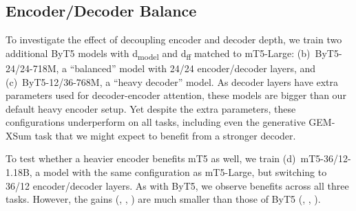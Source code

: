 \documentclass[11pt,a4paper]{article}
\begin{document}
\begin{table}[t!]
\centering
{}
\caption{Ablation model results across three tasks.}
\label{tab:ablation_results}
\end{table} 
\subsection{Encoder/Decoder Balance}

To investigate the effect of decoupling encoder and decoder depth, we train two additional ByT5 models with d\textsubscript{model} and d\textsubscript{ff} matched to \mbox{mT5-Large}: (b)~ByT5-24/24-718M, a ``balanced'' model with 24/24 encoder/decoder layers, and (c)~ByT5-12/36-768M, a ``heavy decoder'' model. As decoder layers have extra parameters used for decoder-encoder attention, these models are bigger than our default heavy encoder setup. Yet despite the extra parameters, these configurations underperform on all tasks, including even the generative \mbox{GEM-XSum} task that we might expect to benefit from a stronger decoder.

To test whether a heavier encoder benefits mT5 as well, we train (d)~mT5-36/12-1.18B, a model with the same configuration as mT5-Large, but switching to 36/12 encoder/decoder layers. As with ByT5, we observe benefits across all three tasks. However, the gains (, , ) are much smaller than those of ByT5 (, , ).
\end{document}
